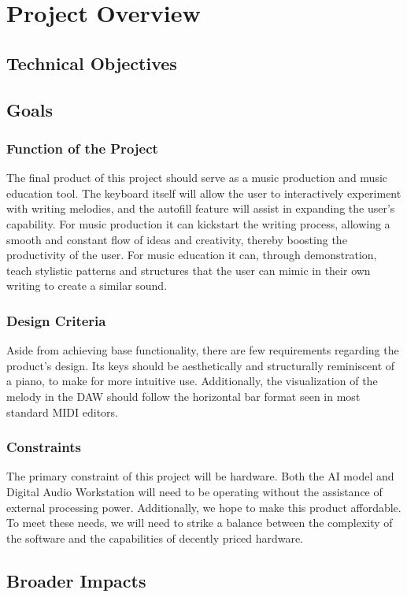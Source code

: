 \section{Project Overview}

\subsection{Technical Objectives}

\subsection{Goals}

\subsubsection{Function of the Project}

The final product of this project should serve as a music production and music
education tool. The keyboard itself will allow the user to interactively experiment with
writing melodies, and the autofill feature will assist in expanding the user’s capability.
For music production it can kickstart the writing process, allowing a smooth and
constant flow of ideas and creativity, thereby boosting the productivity of the user.
For music education it can, through demonstration, teach stylistic patterns and
structures that the user can mimic in their own writing to create a similar sound.


\subsubsection{Design Criteria}

Aside from achieving base functionality, there are few requirements regarding the
product’s design. Its keys should be aesthetically and structurally reminiscent of a
piano, to make for more intuitive use. Additionally, the visualization of the melody in
the DAW should follow the horizontal bar format seen in most standard MIDI editors.

\subsubsection{Constraints}

The primary constraint of this project will be hardware. Both the AI model and Digital
Audio Workstation will need to be operating without the assistance of external
processing power. Additionally, we hope to make this product affordable. To meet
these needs, we will need to strike a balance between the complexity of the software
and the capabilities of decently priced hardware.



\subsection{Broader Impacts}

